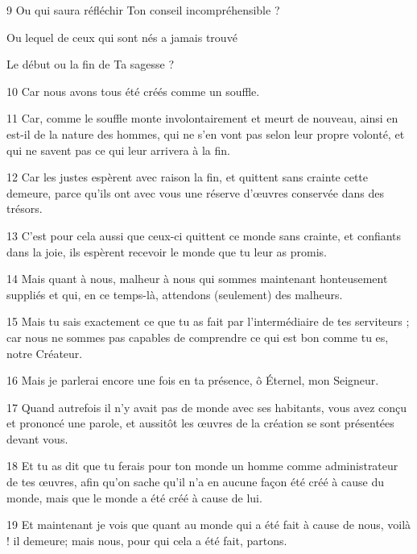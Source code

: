 \par 9 Ou qui saura réfléchir Ton conseil incompréhensible ?

\par Ou lequel de ceux qui sont nés a jamais trouvé

\par Le début ou la fin de Ta sagesse ?


\par 10 Car nous avons tous été créés comme un souffle.

\par 11 Car, comme le souffle monte involontairement et meurt de nouveau, ainsi en est-il de la nature des hommes, qui ne s'en vont pas selon leur propre volonté, et qui ne savent pas ce qui leur arrivera à la fin.

\par 12 Car les justes espèrent avec raison la fin, et quittent sans crainte cette demeure, parce qu'ils ont avec vous une réserve d'œuvres conservée dans des trésors.

\par 13 C'est pour cela aussi que ceux-ci quittent ce monde sans crainte, et confiants dans la joie, ils espèrent recevoir le monde que tu leur as promis.

\par 14 Mais quant à nous, malheur à nous qui sommes maintenant honteusement suppliés et qui, en ce temps-là, attendons (seulement) des malheurs.

\par 15 Mais tu sais exactement ce que tu as fait par l'intermédiaire de tes serviteurs ; car nous ne sommes pas capables de comprendre ce qui est bon comme tu es, notre Créateur.

\par 16 Mais je parlerai encore une fois en ta présence, ô Éternel, mon Seigneur.

\par 17 Quand autrefois il n'y avait pas de monde avec ses habitants, vous avez conçu et prononcé une parole, et aussitôt les œuvres de la création se sont présentées devant vous.

\par 18 Et tu as dit que tu ferais pour ton monde un homme comme administrateur de tes œuvres, afin qu'on sache qu'il n'a en aucune façon été créé à cause du monde, mais que le monde a été créé à cause de lui.

\par 19 Et maintenant je vois que quant au monde qui a été fait à cause de nous, voilà ! il demeure; mais nous, pour qui cela a été fait, partons.

